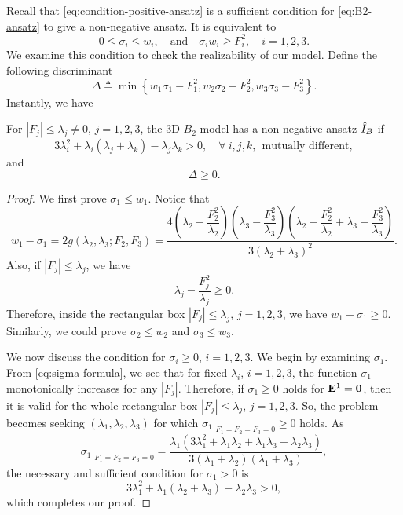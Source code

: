 Recall that 
\eqref{eq:condition-positive-ansatz} is a sufficient condition for
\eqref{eq:B2-ansatz} to give a non-negative ansatz. It is equivalent
to
\begin{equation}\label{eq:condition-realizable-v1}
  0 \leq \sigma_i \leq w_i,\quad
  \text{and}\quad \sigma_i w_i \geq F_i^2,\quad
  i = 1,2,3.
\end{equation}
We examine this condition to check the realizability of our
model. Define the following discriminant
\begin{equation}\label{eq:discriminant}
  \Delta \triangleq \min \left\{w_1 \sigma_1 - F_1^2, w_2 \sigma_2 - F_2^2, w_3
  \sigma_3 - F_3^2 \right\}.
\end{equation}
Instantly, we have
\begin{theorem}\label{thm:condition-nonnegative-ansatz}
  For $|F_j| \leq \lambda_j \neq 0$, $j = 1,2,3$, the 3D $B_2$ model has
  a non-negative ansatz $\hat I_B$ if 
  \begin{equation}\label{eq:cond-sigma-positive}
    3 \lambda_i^2 + \lambda_i (\lambda_j + \lambda_k) - \lambda_j
    \lambda_k > 0, \quad \forall~i,j,k,~~\text{mutually different},
  \end{equation}
  and
  \[ 
  \Delta \geq 0.
  \]
\end{theorem}
\begin{proof}
  We first prove $\sigma_1 \leq w_1$. Notice that 
  \[
    w_1 - \sigma_1 = 2 g(\lambda_2,\lambda_3; F_2,F_3)
    = \dfrac{4 \left(\lambda_2 - \dfrac{F_2^2}{\lambda_2}\right)
      \left(\lambda_3-\dfrac{F_3^2}{\lambda_3}\right)
      \left(\lambda_2 - \dfrac{F_2^2}{\lambda_2} +
    \lambda_3 - \dfrac{F_3^2}{\lambda_3}\right)}{3
    (\lambda_2 + \lambda_3)^2}.
  \]
  Also, if $|F_j| \leq \lambda_j$, we have 
  \[
    \lambda_j - \dfrac{F_j^2}{\lambda_j} \geq 0.
  \]
  Therefore, inside the rectangular box $|F_j| \leq \lambda_j$, $j = 1,2,3$,
  we have $w_1 - \sigma_1 \geq 0$. Similarly, we could prove
  $\sigma_2 \leq w_2$ and $\sigma_3 \leq w_3$.

  We now discuss the condition for $\sigma_i \geq 0$, $i = 1,2,3$.
  We begin by examining $\sigma_1$. From \eqref{eq:sigma-formula}, we see that 
  for fixed $\lambda_i$, $i = 1,2,3$, the function $\sigma_1$ monotonically increases
  for any $|F_j|$. Therefore, if $\sigma_1 \geq 0$ holds for $\mathbf{E}^1 = \boldsymbol{0}$, 
  then it is valid for the whole rectangular box
  $|F_j| \leq \lambda_j$, $j = 1,2,3$. So, the problem becomes seeking
  $(\lambda_1, \lambda_2,\lambda_3)$ for which
  $\left.\sigma_1\right|_{F_1 = F_2 = F_3 = 0} \geq 0$ holds. As
  \[
    \left.\sigma_1\right|_{F_1=F_2=F_3=0} = 
    \dfrac{\lambda_1(3\lambda_1^2 + \lambda_1\lambda_2 + \lambda_1 \lambda_3
    - \lambda_2\lambda_3)}{3(\lambda_1 + \lambda_2)(\lambda_1 + \lambda_3)},
  \]
  the necessary and sufficient condition for $\sigma_1 > 0$ is
  \begin{equation}\label{eq:cond-sigma-positive-1}
    3\lambda_1^2 + \lambda_1(\lambda_2 + \lambda_3) - \lambda_2\lambda_3 
    > 0,
  \end{equation}
which completes our proof.
\end{proof}
